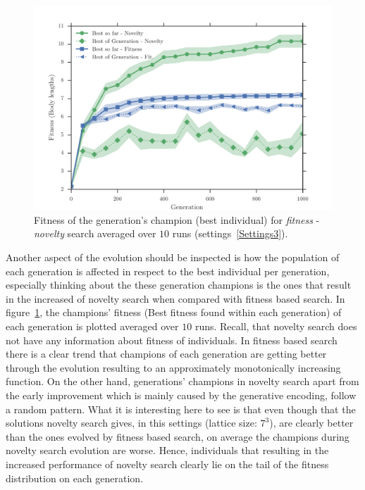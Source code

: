 \begin{figure}[t!]
\centering
\includegraphics[width=1.0\textwidth]{../Figures/Results/AvgGenerChampNoveltyFitnessSize7.pdf}
\caption{Fitness of the generation's champion (best individual) for \emph{fitness} - \emph{novelty} search averaged over $10$ runs (settings~\ref{Settings3}).}
\label{fig:AvgGenerChampNoveltyFitnessSize7}
\end{figure}

Another aspect of the evolution should be inspected is how the population of each generation is affected in respect to the best individual per generation, especially thinking about the these generation champions is the ones that result in the increased of novelty search when compared with fitness based search. In figure~\ref{fig:AvgGenerChampNoveltyFitnessSize7}, the champions' fitness (Best fitness found within each generation) of each generation is plotted averaged over $10$ runs. Recall, that novelty search does not have any information about fitness of individuals. In fitness based search there is a clear trend that champions of each generation are getting better through the evolution resulting to an approximately monotonically increasing function. On the other hand, generations' champions in novelty search apart from the early improvement which is mainly caused by the generative encoding, follow a random pattern. What it is interesting here to see is that even though that the solutions novelty search gives, in this settings (lattice size: $7^3$), are clearly better than the ones evolved by fitness based search, on average the champions during novelty search evolution are worse. Hence, individuals that resulting in the increased performance of novelty search clearly lie on the tail of the fitness distribution on each generation.


